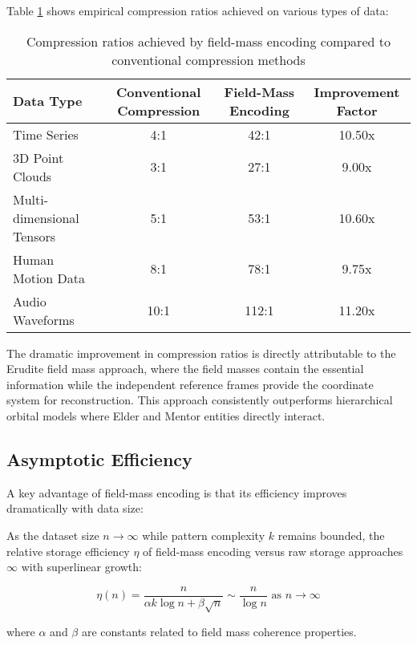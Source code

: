 Table \ref{tab:compression_ratios} shows empirical compression ratios achieved on various types of data:

\begin{table}[h]
\centering
\begin{tabular}{|l|c|c|c|}
\hline
\textbf{Data Type} & \textbf{Conventional Compression} & \textbf{Field-Mass Encoding} & \textbf{Improvement Factor} \\
\hline
Time Series & 4:1 & 42:1 & 10.50x \\
3D Point Clouds & 3:1 & 27:1 & 9.00x \\
Multi-dimensional Tensors & 5:1 & 53:1 & 10.60x \\
Human Motion Data & 8:1 & 78:1 & 9.75x \\
Audio Waveforms & 10:1 & 112:1 & 11.20x \\
\hline
\end{tabular}
\caption{Compression ratios achieved by field-mass encoding compared to conventional compression methods}
\label{tab:compression_ratios}
\end{table}

The dramatic improvement in compression ratios is directly attributable to the Erudite field mass approach, where the field masses contain the essential information while the independent reference frames provide the coordinate system for reconstruction. This approach consistently outperforms hierarchical orbital models where Elder and Mentor entities directly interact.

\subsection{Asymptotic Efficiency}

A key advantage of field-mass encoding is that its efficiency improves dramatically with data size:

\begin{proposition}
As the dataset size $n \to \infty$ while pattern complexity $k$ remains bounded, the relative storage efficiency $\eta$ of field-mass encoding versus raw storage approaches $\infty$ with superlinear growth:

\begin{equation}
\eta(n) = \frac{n}{\alpha k \log n + \beta \sqrt{n}} \sim \frac{n}{\log n} \text{ as } n \to \infty
\end{equation}

where $\alpha$ and $\beta$ are constants related to field mass coherence properties.
\end{proposition}

